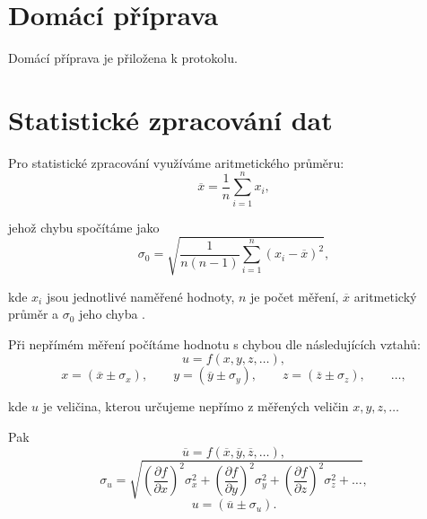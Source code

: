 \documentclass[english]{article}
\begin{document}
\section{Domácí příprava}
	Domácí příprava je přiložena k protokolu.
\section{Statistické zpracování dat}

	Pro statistické zpracování využíváme aritmetického průměru:
	\begin{equation} \label{eq:aritmeticky_prumer}
	\overline{x} = \frac{1}{n}\sum\limits_{i=1}^{n}x_i,
	\end{equation}
%
%	
	
	
	jehož chybu spočítáme jako 
	\begin{equation} \label{eq:chyba_aritmetickeho_prumeru}
	\sigma_0 = \sqrt{\frac{1}{n(n-1)} \sum\limits_{i=1}^{n}\left( x_i - \overline{x} \right)^2 },
	\end{equation}
	
	kde $ x_i $ jsou jednotlivé naměřené hodnoty, $ n $ je počet měření, $ \overline{x} $ aritmetický průměr a $ \sigma_0 $ jeho chyba \cite{bib:chyby}.
	
Při nepřímém měření počítáme hodnotu s chybou dle následujících vztahů:
	\begin{equation}
	u = f(x, y, z, \ldots),
	\end{equation}
	\begin{displaymath}
	x = (\overline{x} \pm \sigma_x), \qquad
	y = (\overline{y} \pm \sigma_y), \qquad
	z = (\overline{z} \pm \sigma_z), \qquad
	\ldots,
	\end{displaymath}
	
	kde $ u $ je veličina, kterou určujeme nepřímo z měřených veličin $ x, y, z, \ldots $ 
	
	Pak
	\begin{displaymath}
	\overline{u} = f(\overline{x}, \overline{y}, \overline{z}, \ldots),
	\end{displaymath}
	\begin{equation}\label{eq:chyba_neprime_mereni}
	\sigma_u = \sqrt{\left( \frac{\partial f}{\partial x} \right)^2 \sigma^2_x + \left( \frac{\partial f}{\partial y} \right)^2 \sigma^2_y + \left( \frac{\partial f}{\partial z} \right)^2 \sigma^2_z + \ldots},
	\end{equation}
	\begin{displaymath}
	u = (\overline{u} \pm \sigma_ u).
	\end{displaymath}
\end{document}
